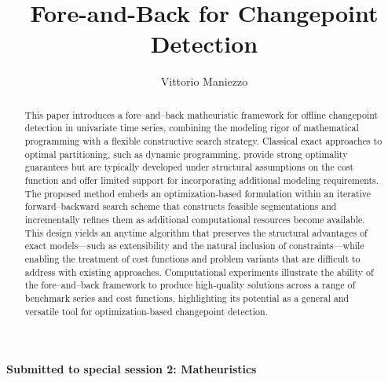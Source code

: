 \documentclass[runningheads]{llncs}
\begin{document}
%
\title{Fore-and-Back for Changepoint Detection}

\author{Vittorio Maniezzo}

%
%
\maketitle              %

{\bf Submitted to special session 2: Matheuristics}

%
\begin{abstract}
This paper introduces a fore–and–back matheuristic framework for offline changepoint detection in univariate time series, combining the modeling rigor of mathematical programming with a flexible constructive search strategy. Classical exact approaches to optimal partitioning, such as dynamic programming, provide strong optimality guarantees but are typically developed under structural assumptions on the cost function and offer limited support for incorporating additional modeling requirements.
The proposed method embeds an optimization-based formulation within an iterative forward–backward search scheme that constructs feasible segmentations and incrementally refines them as additional computational resources become available. This design yields an anytime algorithm that preserves the structural advantages of exact models—such as extensibility and the natural inclusion of constraints—while enabling the treatment of cost functions and problem variants that are difficult to address with existing approaches.
Computational experiments illustrate the ability of the fore–and–back framework to produce high-quality solutions across a range of benchmark series and cost functions, highlighting its potential as a general and versatile tool for optimization-based changepoint detection.
\end{abstract}
%
%
%
\end{document}
